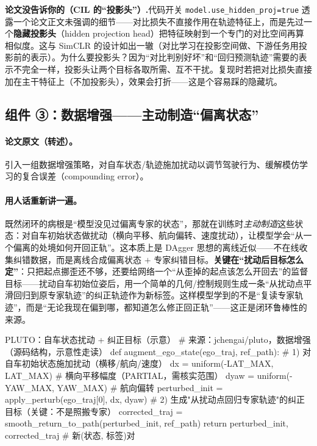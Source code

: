 \begin{note}
\textbf{论文没告诉你的（CIL 的“投影头”）.}\;代码开关 \texttt{model.use\_hidden\_proj=true} 透露一个论文正文未强调的细节——对比损失不直接作用在轨迹特征上，而是先过一个\textbf{隐藏投影头}（hidden projection head）把特征映射到一个专门的对比空间再算相似度。这与 SimCLR 的设计如出一辙（对比学习在投影空间做、下游任务用投影前的表示）。为什么要投影头？因为“对比判别好坏”和“回归预测轨迹”需要的表示不完全一样，投影头让两个目标各取所需、互不干扰。复现时若把对比损失直接加在主干特征上（不加投影头），效果会打折——这是个容易踩的隐藏坑。
\end{note}

\subsection{组件 ③：数据增强——主动制造“偏离状态”}
\label{sec:de-augment}

\paragraph{论文原文（转述）。}
引入一组数据增强策略，对自车状态/轨迹施加扰动以调节驾驶行为、缓解模仿学习的复合误差（compounding error）\cite{cheng2024pluto}。

\paragraph{用人话重新讲一遍。}
既然闭环的病根是“模型没见过偏离专家的状态”，那就在训练时\emph{主动制造}这些状态：对自车初始状态做扰动（横向平移、航向偏转、速度扰动），让模型学会“从一个偏离的处境如何开回正轨”。这本质上是 DAgger\cite{ross2011dagger} 思想的离线近似——不在线收集纠错数据，而是离线合成偏离状态 $+$ 专家纠错目标。\textbf{关键在“扰动后目标怎么定”}：只把起点挪歪还不够，还要给网络一个“从歪掉的起点该怎么开回去”的监督目标——扰动自车初始位姿后，用一个简单的几何/控制规则生成一条“从扰动点平滑回归到原专家轨迹”的纠正轨迹作为新标签。这样模型学到的不是“复读专家轨迹”，而是“无论我现在偏到哪，都知道怎么修正回正轨”——这正是闭环鲁棒性的来源。

\begin{codebox}[Python]{PLUTO：自车状态扰动 + 纠正目标（示意）}
# 来源：jchengai/pluto，数据增强（源码结构，示意性走读）
def augment_ego_state(ego_traj, ref_path):
    # 1) 对自车初始状态施加扰动（横移/航向/速度）
    dx = uniform(-LAT_MAX, LAT_MAX)        # 横向平移幅度（PARTIAL，需核实范围）
    dyaw = uniform(-YAW_MAX, YAW_MAX)      # 航向偏转
    perturbed_init = apply_perturb(ego_traj[0], dx, dyaw)
    # 2) 生成"从扰动点回归专家轨迹"的纠正目标（关键：不是照搬专家）
    corrected_traj = smooth_return_to_path(perturbed_init, ref_path)
    return perturbed_init, corrected_traj  # 新(状态, 标签)对
\end{codebox}

